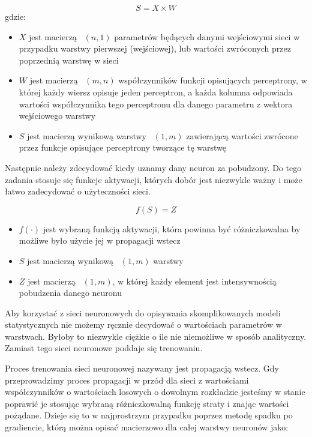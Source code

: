 \documentclass{article}
\begin{document}
\begin {equation}
    S = X \times W
\end{equation}
gdzie:
\begin{itemize}
    \item $X$ jest macierzą ~$(n, 1)$ parametrów będących danymi 
    wejściowymi sieci w przypadku warstwy pierwszej (wejściowej), 
    lub wartości zwróconych przez poprzednią warstwę w sieci
    \item $W$ jest macierzą ~$(m, n)$ współczynników funkcji opisujących perceptrony, 
    w której każdy wiersz opisuje jeden perceptron, 
    a każda kolumna odpowiada wartości współczynnika tego perceptronu dla danego parametru 
    z wektora wejściowego warstwy
    \item $S$ jest macierzą wynikową warstwy ~$(1, m)$ zawierającą wartości zwrócone przez 
    funkcje opisujące perceptrony tworzące tę warstwę
\end{itemize}

Następnie należy zdecydować kiedy uznamy dany neuron za pobudzony. Do tego zadania 
stosuje się funkcje aktywacji, których dobór jest niezwykle ważny
i może łatwo zadecydować o użyteczności sieci.

\begin{equation}
    f(S) = Z
\end{equation}

\begin{itemize}
    \item $f(\cdot)$ jest wybraną funkcją aktywacji, która powinna być 
    różniczkowalna by możliwe było użycie jej w propagacji wstecz
    \item $S$ jest macierzą wynikową ~$(1, m)$ warstwy
    \item $Z$ jest macierzą ~$(1, m)$, w której każdy element jest intensywnością pobudzenia danego neuronu
\end{itemize}

Aby korzystać z sieci neuronowych do opisywania skomplikowanych modeli 
statystycznych nie możemy ręcznie decydować o wartościach parametrów w warstwach. 
Byłoby to niezwykle ciężkie o ile nie niemożliwe w sposób analityczny. 
Zamiast tego sieci neuronowe poddaje się trenowaniu.

Proces trenowania sieci neuronowej nazywany jest propagacją wstecz. Gdy 
przeprowadzimy proces propagacji w przód dla sieci z wartościami współczynników
o wartościach losowych o dowolnym rozkładzie jesteśmy w stanie poprawić 
je stosując wybraną różniczkowalną funkcję straty i znając wartości pożądane. Dzieje się to 
w najprostrzym przypadku poprzez metodę spadku po gradiencie, którą można 
opisać macierzowo dla całej warstwy neuronów jako:
\end{document}
